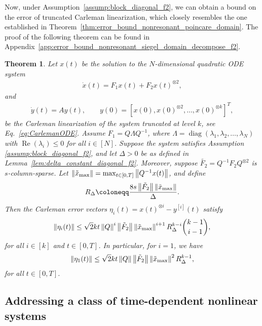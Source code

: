 \documentclass[superscriptaddress,onecolumn,nofootinbib,longbibliography,a4paper,accepted=2026-09-29]{quantumarticle}
\theoremstyle{plain}
\newtheorem{thm}{Theorem}
\theoremstyle{definition}
\numberwithin{thm}{section}
\numberwithin{assumption}{section}
\numberwithin{lemma}{section}
\numberwithin{prop}{section}
\numberwithin{cor}{section}
\numberwithin{definition}{section}
\numberwithin{rmk}{section}
\numberwithin{equation}{section}
\newcommand{\norm}[1]     {\left\| #1 \right\|}
\newcommand{\ot}{\otimes}
\newcommand{\lrb}[1]{\left ( #1 \right )}
\newcommand{\defeq}{\coloneqq}
\newcommand{\realpart}[1]{\operatorname{Re}\lrb{#1}}
\newcommand{\diag}[1]{\operatorname{diag}\lrb{#1}}
\begin{document}
Now, under Assumption~\ref{assump:block_diagonal_f2}, we can obtain a bound on the error of truncated Carleman linearization, which closely resembles the one established in Theorem~\ref{thm:error_bound_nonresonant_poincare_domain}. The proof of the following theorem can be found in Appendix~\ref{app:error_bound_nonresonant_siegel_domain_decompose_f2}.

\begin{thm}
Let $x(t)$ be the solution to the $N$-dimensional quadratic ODE system
\begin{align}
    \dot{x}(t) = F_1 x(t) + F_2 x(t)^{\ot 2},
\end{align}
and
\begin{align}
    \dot{y}(t) = A y(t),\qquad y(0)=[x(0),x(0)^{\ot 2},\dots,x(0)^{\ot k}]^T,
\end{align}
be the Carleman linearization of the system truncated at level $k$, see Eq.~\eqref{eq:CarlemanODE}. Assume $F_1=Q\Lambda Q^{-1}$, where $\Lambda=\diag{\lambda_1, \lambda_2, \dots, \lambda_N}$ with  $\realpart{\lambda_i} \le 0$ for all $i \in [N]$. Suppose the system satisfies Assumption 
\ref{assump:block_diagonal_f2}, and 
let $\Delta > 0$ be as defined in Lemma~\ref{lem:delta_constant_diagonal_f2}.
Moreover, suppose
$\tilde{F_2}=Q^{-1}F_2Q^{\otimes 2}$ is $s$-column-sparse. Let 
$\norm{\tilde{x}_{\rm max}}=\max_{t \in [0,T]} \norm{Q^{-1}x(t)}$, and define
\begin{align}
    R_{\Delta} \defeq \frac{8 s \norm{\tilde{F}_2} \norm{\tilde{x}_{\rm max}}}{\Delta}.
\end{align}
Then the Carleman error vectors $\eta_i(t) = x(t)^{\ot i}-y^{[i]}(t)$ satisfy 
\begin{align}
\norm{\eta_i(t)} \le \sqrt{2} k t  \norm{Q}^i \norm{\tilde{F}_2} \norm{\tilde{x}_{\rm max}}^{i+1} R_{\Delta}^{k-i} \binom{k-1}{i-1} ,
\end{align}
for all $i\in [k]$ and $t \in [0, T]$.
In particular, for $i=1$, we have
\begin{align}
\norm{\eta_1(t)} 
\le \sqrt{2} k t \norm{Q}\norm{\tilde{F}_2} \norm{\tilde{x}_{\rm max}}^2 R_{\Delta}^{k-1},    
\end{align}
for all $t \in [0, T]$.
\label{thm:error_bound_nonresonant_siegel_domain_decompose_f2}
\end{thm}


\subsection{Addressing a class of time-dependent nonlinear systems}
\label{subsec:certain_time_dependent_systems}
\end{document}
